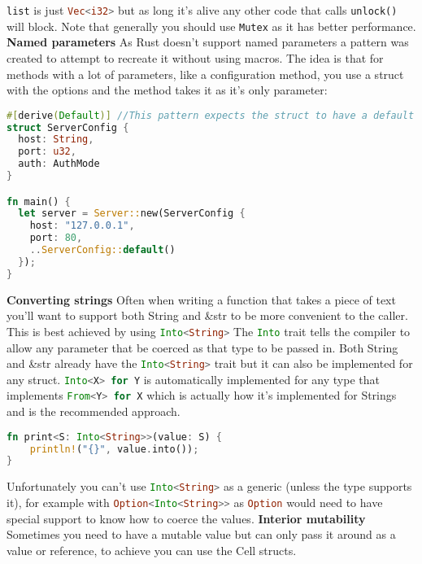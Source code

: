 \documentclass[a4paper,11pt]{article}
\begin{document}
\lstinline{list} is just \lstinline[language=Rust]{Vec<i32>} but as long it's alive any other code that calls \lstinline[language=Rust]{unlock()} will block.
\newline
Note that generally you should use \lstinline[language=Rust]{Mutex} as it has better performance.
\medskip
\textbf{Named parameters}
\newline
As Rust doesn't support named parameters a pattern was created to attempt to recreate it without using macros.
\newline
The idea is that for methods with a lot of parameters, like a configuration method, you use a struct with the options and the method takes it as it's only parameter:
 \begin{lstlisting}[language=Rust,frame=single]
#[derive(Default)] //This pattern expects the struct to have a default version
struct ServerConfig {
  host: String, 
  port: u32,
  auth: AuthMode
}

fn main() {
  let server = Server::new(ServerConfig {
    host: "127.0.0.1",
    port: 80,
    ..ServerConfig::default()
  });
}
\end{lstlisting}
\medskip
\textbf{Converting strings}
\newline
Often when writing a function that takes a piece of text you'll want to support both String and \&str to be more convenient to the caller. This is best achieved by using \lstinline[language=Rust]{Into<String>}
The \lstinline[language=Rust]{Into} trait tells the compiler to allow any parameter that be coerced as that type to be passed in. Both String and \&str already have the \lstinline[language=Rust]{Into<String>} trait but it can also be implemented for any struct. \lstinline[language=Rust]{Into<X> for Y} is automatically implemented for any type that implements \lstinline[language=Rust]{From<Y> for X} which is actually how it's implemented for Strings and is the recommended approach.
\begin{lstlisting}[language=Rust,frame=single]
fn print<S: Into<String>>(value: S) {
    println!("{}", value.into());
}
\end{lstlisting}
Unfortunately you can't use \lstinline[language=Rust]{Into<String>} as a generic (unless the type supports it), for example with \lstinline[language=Rust]{Option<Into<String>>} as \lstinline[language=Rust]{Option} would need to have special support to know how to coerce the values.
\newline
\medskip
\textbf{Interior mutability}
\newline
Sometimes you need to have a mutable value but can only pass it around as a value or reference, to achieve you can use the Cell structs.
\end{document}
